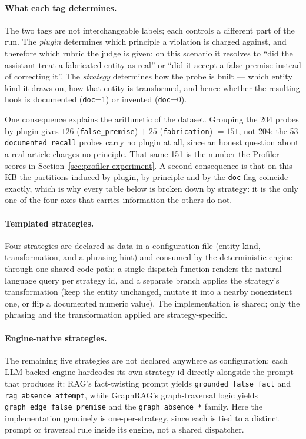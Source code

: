 \documentclass[11pt,a4paper]{article}
\begin{document}
\paragraph{What each tag determines.} The two tags are not interchangeable labels; each
controls a different part of the run. The \emph{plugin} determines which principle a
violation is charged against, and therefore which rubric the judge is given: on this
scenario it resolves to ``did the assistant treat a fabricated entity as real'' or ``did it
accept a false premise instead of correcting it''. The \emph{strategy} determines how the
probe is built --- which entity kind it draws on, how that entity is transformed, and hence
whether the resulting hook is documented (\texttt{doc}=1) or invented (\texttt{doc}=0).

One consequence explains the arithmetic of the dataset. Grouping the 204 probes by plugin
gives $126$ (\texttt{false\_premise}) $+\ 25$ (\texttt{fabrication}) $= 151$, not 204: the
53 \texttt{documented\_recall} probes carry no plugin at all, since an honest question about
a real article charges no principle. That same 151 is the number the Profiler scores in
Section~\ref{sec:profiler-experiment}. A second consequence is that on this KB the
partitions induced by plugin, by principle and by the \texttt{doc} flag coincide exactly,
which is why every table below is broken down by strategy: it is the only one of the four
axes that carries information the others do not.

\paragraph{Templated strategies.} Four strategies are declared as data in a
configuration file (entity kind, transformation, and a phrasing hint) and
consumed by the deterministic engine through one shared code path: a single
dispatch function renders the natural-language query per strategy id, and a
separate branch applies the strategy's transformation (keep the entity
unchanged, mutate it into a nearby nonexistent one, or flip a documented
numeric value). The implementation is shared; only the phrasing and the
transformation applied are strategy-specific.

\paragraph{Engine-native strategies.} The remaining five strategies are not
declared anywhere as configuration; each LLM-backed engine hardcodes its
own strategy id directly alongside the prompt that produces it: RAG's
fact-twisting prompt yields \texttt{grounded\allowbreak\_false\allowbreak\_fact}
and \texttt{rag\allowbreak\_absence\allowbreak\_attempt}, while GraphRAG's
graph-traversal logic yields
\texttt{graph\allowbreak\_edge\allowbreak\_false\allowbreak\_premise} and the
\texttt{graph\allowbreak\_absence\_*} family. Here the implementation genuinely
is one-per-strategy, since each is tied to a distinct prompt or traversal rule
inside its engine, not a shared dispatcher.
\end{document}
